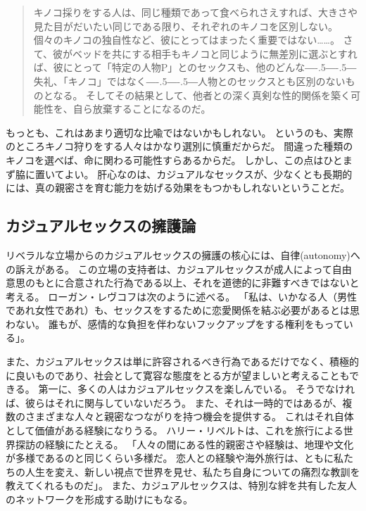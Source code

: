 \documentclass[paper=a4,book,openany]{jlreq}
\def\DDASH{―\kern-.5\zw―\kern-.5\zw―} %
\begin{document}
\begin{quote}
  キノコ採りをする人は、同じ種類であって食べられさえすれば、大きさや見た目がだいたい同じである限り、それぞれのキノコを区別しない。
個々のキノコの独自性など、彼にとってはまったく重要ではない……。
さて、彼がベッドを共にする相手もキノコと同じように無差別に選ぶとすれば、彼にとって「特定の人物P」とのセックスも、他のどんな{\DDASH}失礼、「キノコ」ではなく{\DDASH}人物とのセックスとも区別のないものとなる。
そしてその結果として、他者との深く真剣な性的関係を築く可能性を、自ら放棄することになるのだ。
\citep[p.101]{krisjansson98:_casual_sex_revis}
\end{quote}

もっとも、これはあまり適切な比喩ではないかもしれない。
というのも、実際のところキノコ狩りをする人々はかなり選別に慎重だからだ。
間違った種類のキノコを選べば、命に関わる可能性すらあるからだ。
しかし、この点はひとまず脇に置いてよい。
肝心なのは、カジュアルなセックスが、少なくとも長期的には、真の親密さを育む能力を妨げる効果をもつかもしれないということだ。

\subsection{カジュアルセックスの擁護論}

リベラルな立場からのカジュアルセックスの擁護の核心には、自律(autonomy)への訴えがある。
この立場の支持者は、カジュアルセックスが成人によって自由意思のもとに合意された行為である以上、それを道徳的に非難すべきではないと考える。
ローガン・レヴコフは次のように述べる。
「私は、いかなる人（男性であれ女性であれ）も、セックスをするために恋愛関係を結ぶ必要があるとは思わない。
誰もが、感情的な負担を伴わないフックアップをする権利をもっている」\citep{levkoff13:_penn_grad_resp}。

また、カジュアルセックスは単に許容されるべき行為であるだけでなく、積極的に良いものであり、社会として寛容な態度をとる方が望ましいと考えることもできる。
第一に、多くの人はカジュアルセックスを楽しんでいる。
そうでなければ、彼らはそれに関与していないだろう。
また、それは一時的ではあるが、複数のさまざまな人々と親密なつながりを持つ機会を提供する。
これはそれ自体として価値がある経験になりうる。
ハリー・リベルトは、これを旅行による世界探訪の経験にたとえる。
「人々の間にある性的親密さや経験は、地理や文化が多様であるのと同じくらい多様だ。
恋人との経験や海外旅行は、ともに私たちの人生を変え、新しい視点で世界を見せ、私たち自身についての痛烈な教訓を教えてくれるものだ」\citep[p.414]{liberto17:_prob_sexual_prom}。
また、カジュアルセックスは、特別な絆を共有した友人のネットワークを形成する助けにもなる。
\end{document}
